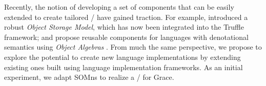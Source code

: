 Recently, the notion of developing a set of components that can be easily extended to create tailored \vms/ have gained traction. For example, \citet{WoB2014} introduced a robust \emph{Object Storage Model}, which has now been integrated into the Truffle framework; and \citet{Inostroza2015} propose reusable components for languages with denotational semantics using \emph{Object Algebras} \cite{Oliveira2012}. From much the same perspective, we propose to explore the potential to create new language implementations by extending existing ones built using language implementation frameworks. As an initial experiment, we adapt SOMns to realize a \vm/ for Grace.


%




%






% 
